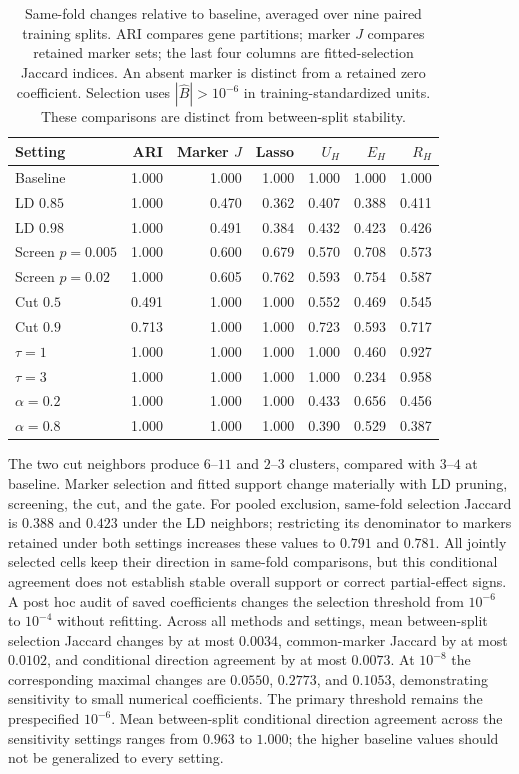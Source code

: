 \documentclass[11pt,a4paper]{article}
\begin{document}
\begin{table}[htbp]\centering\footnotesize
\caption{Same-fold changes relative to baseline, averaged over nine paired training splits. ARI compares gene partitions; marker $J$ compares retained marker sets; the last four columns are fitted-selection Jaccard indices. An absent marker is distinct from a retained zero coefficient. Selection uses $|\widehat B|>10^{-6}$ in training-standardized units. These comparisons are distinct from between-split stability.}\label{tab:eqtl-configuration-stability}
\begin{tabular}{lrrrrrr}\toprule
Setting & ARI & Marker $J$ & Lasso & $U_H$ & $E_H$ & $R_H$\\\midrule
Baseline & 1.000 & 1.000 & 1.000 & 1.000 & 1.000 & 1.000 \\
LD $0.85$ & 1.000 & 0.470 & 0.362 & 0.407 & 0.388 & 0.411 \\
LD $0.98$ & 1.000 & 0.491 & 0.384 & 0.432 & 0.423 & 0.426 \\
Screen $p=0.005$ & 1.000 & 0.600 & 0.679 & 0.570 & 0.708 & 0.573 \\
Screen $p=0.02$ & 1.000 & 0.605 & 0.762 & 0.593 & 0.754 & 0.587 \\
Cut $0.5$ & 0.491 & 1.000 & 1.000 & 0.552 & 0.469 & 0.545 \\
Cut $0.9$ & 0.713 & 1.000 & 1.000 & 0.723 & 0.593 & 0.717 \\
$\tau=1$ & 1.000 & 1.000 & 1.000 & 1.000 & 0.460 & 0.927 \\
$\tau=3$ & 1.000 & 1.000 & 1.000 & 1.000 & 0.234 & 0.958 \\
$\alpha=0.2$ & 1.000 & 1.000 & 1.000 & 0.433 & 0.656 & 0.456 \\
$\alpha=0.8$ & 1.000 & 1.000 & 1.000 & 0.390 & 0.529 & 0.387 \\
\bottomrule\end{tabular}\end{table}
The two cut neighbors produce $6$--$11$ and $2$--$3$ clusters, compared with $3$--$4$ at baseline. Marker selection and fitted support change materially with LD pruning, screening, the cut, and the gate. For pooled exclusion, same-fold selection Jaccard is $0.388$ and $0.423$ under the LD neighbors; restricting its denominator to markers retained under both settings increases these values to $0.791$ and $0.781$. All jointly selected cells keep their direction in same-fold comparisons, but this conditional agreement does not establish stable overall support or correct partial-effect signs.
A post hoc audit of saved coefficients changes the selection threshold from $10^{-6}$ to $10^{-4}$ without refitting. Across all methods and settings, mean between-split selection Jaccard changes by at most $0.0034$, common-marker Jaccard by at most $0.0102$, and conditional direction agreement by at most $0.0073$. At $10^{-8}$ the corresponding maximal changes are $0.0550$, $0.2773$, and $0.1053$, demonstrating sensitivity to small numerical coefficients. The primary threshold remains the prespecified $10^{-6}$. Mean between-split conditional direction agreement across the sensitivity settings ranges from $0.963$ to $1.000$; the higher baseline values should not be generalized to every setting.
\end{document}
